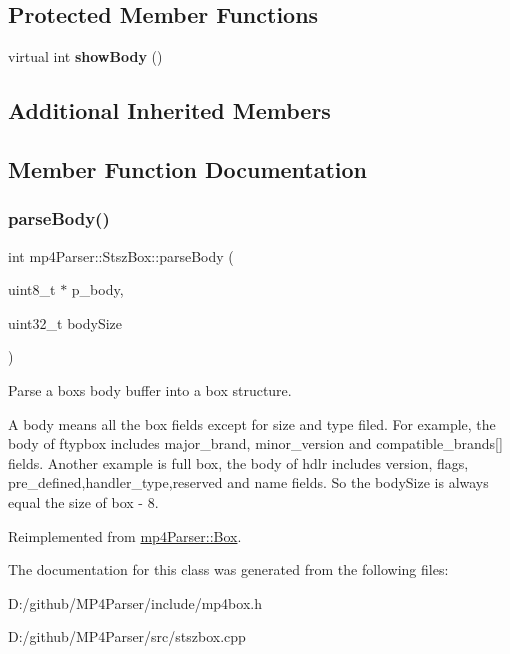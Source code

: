 \subsection*{Protected Member Functions}
\begin{DoxyCompactItemize}
\item 
\mbox{\label{classmp4_parser_1_1_stsz_box_aa69da2cbdbfa9981abb7d556bd22f5d3}} 
virtual int {\bfseries show\+Body} ()
\end{DoxyCompactItemize}
\subsection*{Additional Inherited Members}


\subsection{Member Function Documentation}
\mbox{\label{classmp4_parser_1_1_stsz_box_a65c4c42316cdc488b44cd3c15412e84a}} 
\subsubsection{\texorpdfstring{parseBody()}{parseBody()}}
{\footnotesize\ttfamily int mp4\+Parser\+::\+Stsz\+Box\+::parse\+Body (\begin{DoxyParamCaption}\item[{uint8\+\_\+t $\ast$}]{p\+\_\+body,  }\item[{uint32\+\_\+t}]{body\+Size }\end{DoxyParamCaption})\hspace{0.3cm}{\ttfamily [virtual]}}



Parse a box\textquotesingle{}s body buffer into a box structure. 

A body means all the box fields except for size and type filed. For example, the body of ftypbox includes major\+\_\+brand, minor\+\_\+version and compatible\+\_\+brands\mbox{[}\mbox{]} fields. Another example is full box, the body of hdlr includes version, flags, pre\+\_\+defined,handler\+\_\+type,reserved and name fields. So the body\+Size is always equal the size of box -\/ 8. 

Reimplemented from \mbox{\hyperlink{classmp4_parser_1_1_box_a3dd0c084ac65bc77b69ac5ecaf796cb2}{mp4\+Parser\+::\+Box}}.



The documentation for this class was generated from the following files\+:\begin{DoxyCompactItemize}
\item 
D\+:/github/\+M\+P4\+Parser/include/mp4box.\+h\item 
D\+:/github/\+M\+P4\+Parser/src/stszbox.\+cpp\end{DoxyCompactItemize}
